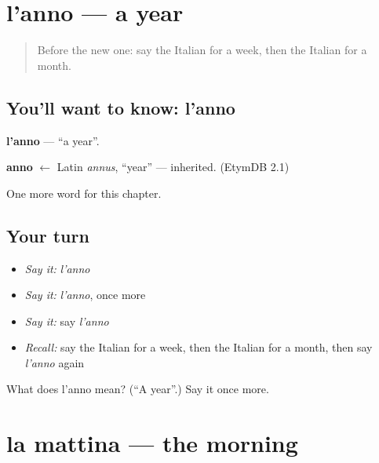 \section[l'anno]{l'anno — a year}

\label{lesson:IT-C78-anno}



\begin{quote}
Before the new one: say the Italian for a week, then the Italian for a month.
\end{quote}

\subsection*{You'll want to know: l'anno}
\textbf{l'anno} — \textquotedblleft{}a year\textquotedblright{}.

\begin{cousinweb}
\textbf{anno} $\leftarrow$ Latin \emph{annus}, \textquotedblleft{}year\textquotedblright{} — inherited. (EtymDB 2.1)
\end{cousinweb}

\begin{grammarlens}[title={What you've built}]
One more word for this chapter.
\end{grammarlens}

\subsection*{Your turn}
\begin{itemize}
\raggedright
  \item \emph{Say it:} \emph{l'anno}
  \item \emph{Say it:} \emph{l'anno}, once more
  \item \emph{Say it:} say \emph{l'anno}
  \item \emph{Recall:} say the Italian for a week, then the Italian for a month, then say \emph{l'anno} again
\end{itemize}

\begin{tcolorbox}[breakable,colback=teal!4,colframe=teal!35!black,title={Before you move on}]
What does l'anno mean? (\textquotedblleft{}A year\textquotedblright{}.) Say it once more.
\end{tcolorbox}
\section[la mattina]{la mattina — the morning}

